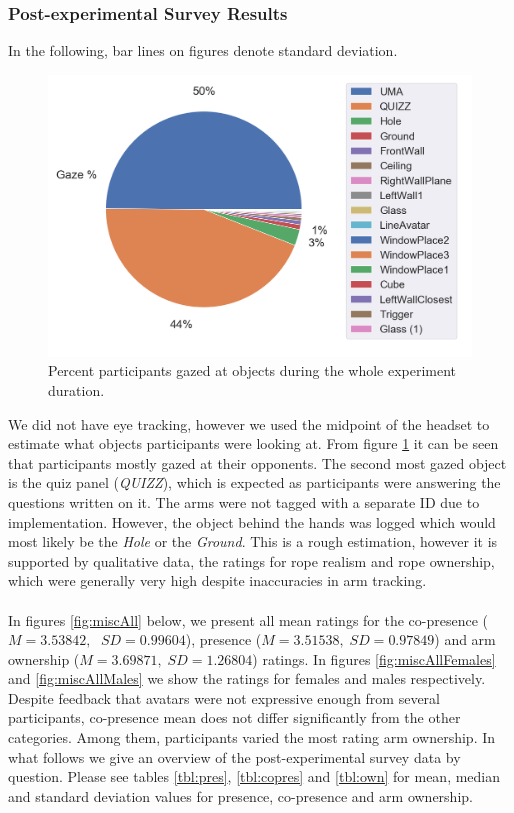 \clearpage

\subsubsection{Post-experimental Survey Results}

In the following, bar lines on figures denote standard deviation.

\begin{figure}[H]
 \centering
 \includegraphics[scale=0.5]{Files/Plots/gaze_plots.png}
 \caption{Percent participants gazed at objects during the whole experiment duration. }
\label{fig:gazePie}
\end{figure}
We did not have eye tracking, however we used the midpoint of the headset to estimate what objects participants were looking at. From figure \ref{fig:gazePie} it can be seen that participants mostly gazed at their opponents. The second most gazed object is the quiz panel (\textit{QUIZZ}), which is expected as participants were answering the questions written on it.  The arms were not tagged with a separate ID due to implementation. However, the object behind the hands was logged which would most likely be the \textit{Hole} or the \textit{Ground}. This is a rough estimation, however it is supported by qualitative data, the ratings for rope realism and rope ownership, which were generally very high despite inaccuracies in arm tracking.\\ 
\\
In figures \ref{fig:miscAll} below, we present all mean ratings for the co-presence ($M=3.53842,\;$ $ SD=0.99604 $), presence ($M=3.51538,\; SD=0.97849 $) and arm ownership ($M=3.69871,\; SD=1.26804 $) ratings. In figures \ref{fig:miscAllFemales} and \ref{fig:miscAllMales} we show the ratings for females and males respectively. Despite feedback that avatars were not expressive enough from several participants, co-presence mean does not differ significantly from the other categories. Among them, participants varied the most rating arm ownership. In what follows we give an overview of the post-experimental survey data by question. Please see tables \ref{tbl:pres}, \ref{tbl:copres} and \ref{tbl:own} for mean, median and standard deviation values for presence, co-presence and arm ownership.
